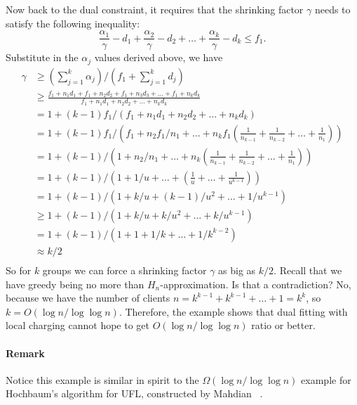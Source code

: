 \documentclass[oneside,final]{ucr}
\begin{document}
Now back to the dual constraint, it requires that the shrinking factor
$\gamma$ needs to satisfy the following inequality:
\begin{equation}
  \frac{\alpha_1}{\gamma} - d_1 + \frac{\alpha_2}{\gamma} - d_2 +
  \ldots + \frac{\alpha_k}{\gamma} - d_k \leq f_1.
\end{equation}
Substitute in the $\alpha_j$ values derived above, we have
\begin{align*}
  \gamma &\geq (\sum_{j=1}^k \alpha_j) / (f_1 + \sum_{j=1}^k d_j)\\
  &\geq \frac{f_1 + n_1 d_1 + f_1 + n_2 d_2 + f_1 + n_3 d_3 + \ldots +
    f_1 + n_k
    d_k}{f_1 + n_1 d_1 + n_2 d_2 + \ldots + n_k d_k}\\
  &= 1 + (k-1)f_1 / (f_1 + n_1 d_1 + n_2 d_2 + \ldots + n_k d_k)\\
  &= 1 + (k-1)f_1 / \left(f_1 + n_2 f_1 / n_1 + \ldots + n_k f_1
    (\frac{1}{n_{k-1}} + \frac{1}{n_{k-2}} + \ldots +
    \frac{1}{n_1})\right)\\
  &= 1 + (k-1) / \left(1 + n_2 / n_1 + \ldots + n_k
    (\frac{1}{n_{k-1}} + \frac{1}{n_{k-2}} + \ldots +
    \frac{1}{n_1})\right)\\
  &= 1 + (k-1) / \left(1 + 1/u + \ldots + (\frac{1}{u} + \ldots +
    \frac{1}{u^{k-1}})\right)\\
  &= 1 + (k-1) / \left(1 + k/u + (k-1)/u^2 + \ldots +
    1/u^{k-1}\right)\\
  &\geq 1 + (k-1) / \left(1 + k/u + k/u^2 + \ldots +
    k/u^{k-1}\right)\\
  &= 1 + (k-1) / \left(1 + 1 + 1/k + \ldots + 1/k^{k-2}\right)\\
  &\approx k/2\\
\end{align*}
So for $k$ groups we can force a shrinking factor $\gamma$
as big as $k/2$. Recall that we have greedy being no more
than $H_n$-approximation. Is that a contradiction? No,
because we have the number of clients $n=k^{k-1} + k^{k-1} +
\ldots + 1 = k^k$, so $k = O(\log n / \log\log
n)$. Therefore, the example shows that dual fitting with
local charging cannot hope to get $O(\log n / \log\log n)$
ratio or better.

\paragraph{Remark} Notice this example is similar in spirit
to the $\Omega(\log n/ \log\log n)$ example for Hochbaum's
algorithm for UFL, constructed by Mahdian {\etal}
~\cite{JainMMSV03}.
\end{document}

